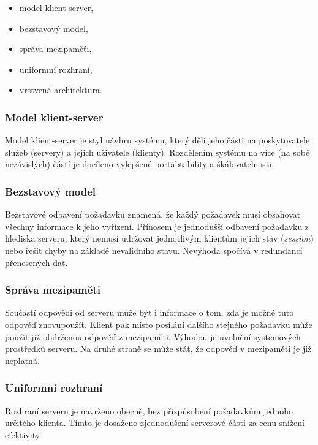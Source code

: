 \begin{itemize}
	\item model klient-server,
	\item bezstavový model,
	\item správa mezipaměťi,
	\item uniformní rozhraní,
	\item vrstvená architektura. \cite{rest}
\end{itemize}

\subsubsection{Model klient-server}

Model klient-server je styl návhru systému, který dělí jeho části na poskytovatele služeb (servery) a jejich uživatele (klienty).
Rozdělením systému na více (na sobě nezávislých) částí je docíleno vylepšené portabtability a škálovatelnosti.
\cite{rest_klient_server}

\subsubsection{Bezstavový model}

Bezstavové odbavení požadavku znamená, že každý požadavek musí obsahovat všechny informace k jeho vyřízení.
Přínosem je jednodušší odbavení požadavku z hlediska serveru, který nemusí udržovat jednotlivým klientům jejich stav (\textit{session}) nebo řešit chyby na základě nevalidního stavu.
Nevýhoda spočívá v redundanci přenesených dat.
\cite{rest_bezstavovy}

\subsubsection{Správa mezipaměti}

Součástí odpovědi od serveru může být i informace o tom, zda je možné tuto odpověď znovupoužít.
Klient pak místo posílání dalšího stejného požadavku může použít již obdrženou odpověď z mezipaměti.
Výhodou je uvolnění systémových prostředků serveru.
Na druhé straně se může stát, že odpověd v mezipaměti je již neplatná.
\cite{rest_mezipamet}

\subsubsection{Uniformní rozhraní}

Rozhraní serveru je navrženo obecně, bez přizpůsobení požadavkům jednoho určitého klienta.
Tímto je dosaženo zjednodušení serverové části za cenu snížení efektivity.
\cite{rest_uniformni}

